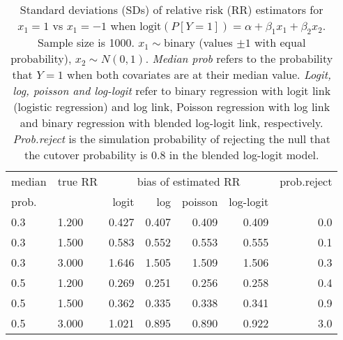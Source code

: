 \documentclass[12pt,a4paper]{article}
\begin{document}
\begin{table}[H] 
\small\sf\centering 
\caption{Standard deviations (SDs) of relative risk (RR) estimators for $x_1=1$ vs $x_1=-1$ when $\mbox{logit}(P[Y=1])=\alpha+\beta_1 x_1 + \beta_2 x_2$. Sample size is 1000. $x_1 \sim $binary (values $\pm 1$ with equal probability), $x_2 \sim N(0,1)$. {\it Median prob} refers to the probability that $Y=1$ when both covariates are at their median value. {\it Logit, log, poisson and log-logit} refer to binary regression with logit link (logistic regression) and log link, Poisson regression with log link and binary regression with blended log-logit link, respectively. {\it Prob.reject} is the simulation probability of rejecting the null that the cutover probability is $0.8$ in the blended log-logit model.} 
\begin{tabular}{llrrrrr} 
\toprule 
median & true RR & \multicolumn{4}{c}{bias of estimated RR} & prob.reject \\ 
prob. & & logit & log & poisson & log-logit  & \\ \midrule 
0.3 & 1.200 & 0.427 & 0.407 & 0.409 & 0.409 & 0.0 \\  
0.3 & 1.500 & 0.583 & 0.552 & 0.553 & 0.555 & 0.1 \\  
0.3 & 3.000 & 1.646 & 1.505 & 1.509 & 1.506 & 0.3 \\  
0.5 & 1.200 & 0.269 & 0.251 & 0.256 & 0.258 & 0.4 \\  
0.5 & 1.500 & 0.362 & 0.335 & 0.338 & 0.341 & 0.9 \\  
0.5 & 3.000 & 1.021 & 0.895 & 0.890 & 0.922 & 3.0 \\  
\bottomrule 
\end{tabular} 
\end{table} 
\end{document}
